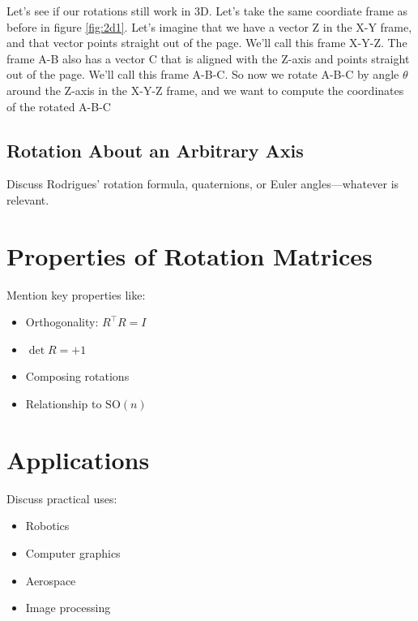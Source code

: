 \documentclass[11pt]{article}
\begin{document}
Let's see if our rotations still work in 3D.  Let's take the same coordiate frame
as before in figure \ref{fig:2d1}.  Let's imagine that we have a vector Z in the X-Y frame,
and that vector points straight out of the page.  We'll call this frame X-Y-Z.  The frame
A-B also has a vector C that is aligned with the Z-axis and points straight out of the page.
We'll call this frame A-B-C.  So now we rotate A-B-C by angle $\theta$ around the Z-axis in the X-Y-Z frame,
and we want to compute the coordinates of the rotated A-B-C 

\subsection{Rotation About an Arbitrary Axis}
Discuss Rodrigues' rotation formula, quaternions, or Euler angles—whatever is relevant.

\section{Properties of Rotation Matrices}
\label{sec:properties}

Mention key properties like:
\begin{itemize}
    \item Orthogonality: \( R^\top R = I \)
    \item \(\det R = +1\)
    \item Composing rotations
    \item Relationship to \(\mathrm{SO}(n)\)
\end{itemize}

\section{Applications}
\label{sec:applications}

Discuss practical uses:
\begin{itemize}
    \item Robotics
    \item Computer graphics
    \item Aerospace
    \item Image processing
\end{itemize}
\end{document}
